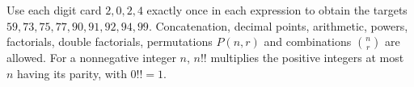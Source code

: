 Use each digit card $2,0,2,4$ exactly once in each expression to obtain the targets $59,73,75,77,90,91,92,94,99$. Concatenation, decimal points, arithmetic, powers, factorials, double factorials, permutations $P(n,r)$ and combinations $\binom nr$ are allowed. For a nonnegative integer $n$, $n!!$ multiplies the positive integers at most $n$ having its parity, with $0!!=1$.
